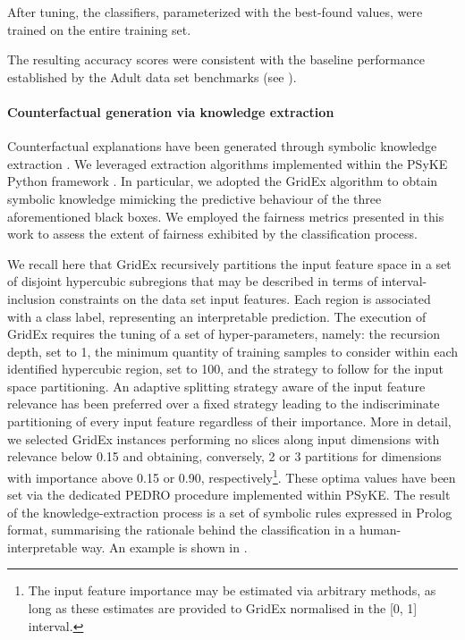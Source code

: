 \documentclass[letterpaper]{article} %
\begin{document}
After tuning, the classifiers, parameterized with the best-found values, were trained on the entire training set.

The resulting accuracy scores were consistent with the baseline performance established by the Adult data set benchmarks (see ).

\paragraph{Counterfactual generation via knowledge extraction}

Counterfactual explanations have been generated through symbolic knowledge extraction \cite{SKESKISLR2024}.
%
We leveraged extraction algorithms implemented within the PSyKE Python framework \cite{psyke-trust-aixia2022}. In particular, we adopted the GridEx algorithm to obtain symbolic knowledge mimicking the predictive behaviour of the three aforementioned black boxes.%
%
We employed the fairness metrics presented in this work to assess the extent of fairness exhibited by the classification process.

We recall here that GridEx recursively partitions the input feature space in a set of disjoint hypercubic subregions that may be described in terms of interval-inclusion constraints on the data set input features.
Each region is associated with a class label, representing an interpretable prediction.
The execution of GridEx requires the tuning of a set of hyper-parameters, namely: the recursion depth, set to 1, the minimum quantity of training samples to consider within each identified hypercubic region, set to 100, and the strategy to follow for the input space partitioning.
%
An adaptive splitting strategy aware of the input feature relevance has been preferred over a fixed strategy leading to the indiscriminate partitioning of every input feature regardless of their importance. More in detail, we selected GridEx instances performing no slices along input dimensions with relevance below 0.15 and obtaining, conversely, 2 or 3 partitions for dimensions with importance above 0.15 or 0.90, respectively\footnote{The input feature importance may be estimated via arbitrary methods, as long as these estimates are provided to GridEx normalised in the [0, 1] interval.}.
%
These optima values have been set via the dedicated PEDRO procedure implemented within PSyKE. %
%
The result of the knowledge-extraction process is a set of symbolic rules expressed in Prolog format, summarising the rationale behind the classification in a human-interpretable way.
%
An example is shown in .
\end{document}
